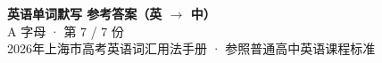 \documentclass[10pt,a4paper]{article}
\begin{document}
\pagestyle{plain}

\begin{center}
{\LARGE\bfseries 英语单词默写 \quad 参考答案（英 $\to$ 中）}\\[0.22em]
{\large A 字母 · 第 7 / 7 份}\\[0.18em]
{\small 2026年上海市高考英语词汇用法手册 · 参照普通高中英语课程标准}
\end{center}

\vspace{0.2em}
\noindent{\color{rulegray}\rule{\textwidth}{0.8pt}}

\vspace{0.35em}

\vspace{0.25em}
\renewcommand{\arraystretch}{1.32}
\end{document}
